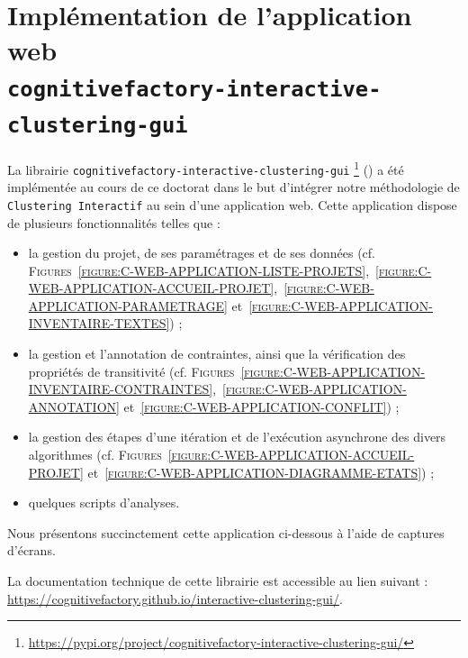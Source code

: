 \section[
		\texttt{cognitivefactory-interactive-clustering-gui}
	]{
		Implémentation de l'application web \\ \texttt{cognitivefactory-interactive-clustering-gui}
	}
\label{annex:C.2-DESCRIPTION-IMPLEMENTATION-INTERACTIVE-CLUSTERING-GUI}

	La librairie \texttt{cognitivefactory-interactive-clustering-gui} \footnote{
		\url{https://pypi.org/project/cognitivefactory-interactive-clustering-gui/}
	} (\cite{schild-etal:2022:cognitivefactory-interactiveclusteringgui}) a été implémentée au cours de ce doctorat dans le but d'intégrer notre méthodologie de \texttt{Clustering Interactif} au sein d'une application web.
	Cette application dispose de plusieurs fonctionnalités telles que :
	\begin{itemize}
		\item la gestion du projet, de ses paramétrages et de ses données (cf. \textsc{Figures}~\textsc{\ref{figure:C-WEB-APPLICATION-LISTE-PROJETS}},~\textsc{\ref{figure:C-WEB-APPLICATION-ACCUEIL-PROJET}},~\textsc{\ref{figure:C-WEB-APPLICATION-PARAMETRAGE}} et~\textsc{\ref{figure:C-WEB-APPLICATION-INVENTAIRE-TEXTES}}) ;
		\item la gestion et l'annotation de contraintes, ainsi que la vérification des propriétés de transitivité (cf. \textsc{Figures}~\textsc{\ref{figure:C-WEB-APPLICATION-INVENTAIRE-CONTRAINTES}},~\textsc{\ref{figure:C-WEB-APPLICATION-ANNOTATION}} et~\textsc{\ref{figure:C-WEB-APPLICATION-CONFLIT}}) ;
		\item la gestion des étapes d'une itération et de l'exécution asynchrone des divers algorithmes (cf. \textsc{Figures}~\textsc{\ref{figure:C-WEB-APPLICATION-ACCUEIL-PROJET}} et~\textsc{\ref{figure:C-WEB-APPLICATION-DIAGRAMME-ETATS}}) ;
		\item quelques scripts d'analyses.
	\end{itemize}
	
	Nous présentons succinctement cette application ci-dessous à l'aide de captures d'écrans.

	
	\begin{leftBarInformation}
		La documentation technique de cette librairie est accessible au lien suivant : \url{https://cognitivefactory.github.io/interactive-clustering-gui/}.
	\end{leftBarInformation}
	
